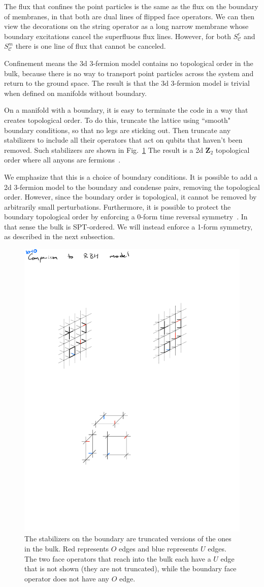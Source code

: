 \documentclass[twocolumn, longbibliography]{revtex4-2}
\newcommand{\C}{\mathcal{C}}
\begin{document}
The flux that confines the point particles is the same as the flux on the boundary of membranes, in that both are dual lines of flipped face operators. We can then view the decorations on the string operator as a long narrow membrane whose boundary excitations cancel the superfluous flux lines. However, for both $S^e_\mathcal{C}$ and $S^m_\C$ there is one line of flux that cannot be canceled.

Confinement means the 3d 3-fermion model contains no topological order in the bulk, because there is no way to transport point particles across the system and return to the ground space. The result is that the 3d 3-fermion model is trivial when defined on manifolds without boundary.

On a manifold with a boundary, it is easy to terminate the code in a way that creates topological order. To do this, truncate the lattice using ``smooth" boundary conditions, so that no legs are sticking out. Then truncate any stabilizers to include all their operators that act on qubits that haven't been removed. Such stabilizers are shown in Fig.~\ref{fig:bdyops} The result is a 2d $\mathbf{Z}_2$ topological order where all anyons are fermions~\cite{BurnellSoluble}.

We emphasize that this is a choice of boundary conditions. It is possible to add a 2d 3-fermion model to the boundary and condense pairs, removing the topological order. However, since the boundary order is topological, it cannot be removed by arbitrarily small perturbations. Furthermore, it is possible to protect the boundary topological order by enforcing a 0-form time reversal symmetry~\cite{BurnellSoluble}. In that sense the bulk is SPT-ordered. We will instead enforce a 1-form symmetry, as described in the next subsection.

\begin{figure}
\centering
\includegraphics[width=.6\linewidth]{bdyops}
\caption{The stabilizers on the boundary are truncated versions of the ones in the bulk. Red represents $O$ edges and blue represents $U$ edges. The two face operators that reach into the bulk each have a $U$ edge that is not shown (they are not truncated), while the boundary face operator does not have any $O$ edge.}
\label{fig:bdyops}
\end{figure}
\end{document}
